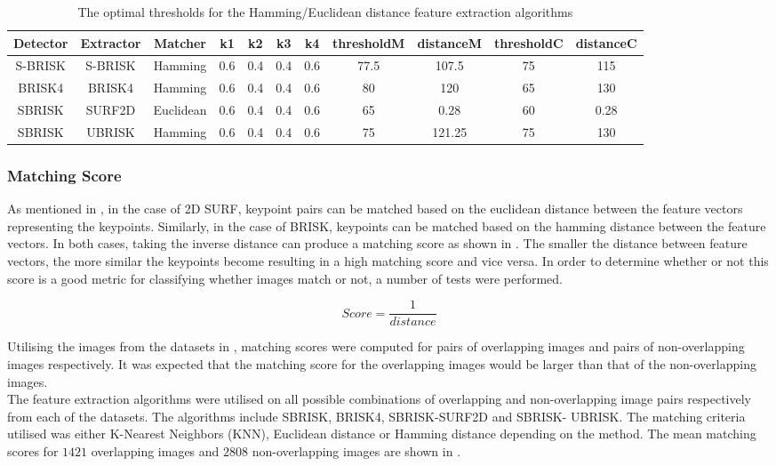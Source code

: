 \documentclass{article}
\begin{document}
\begin{table}
\caption{The optimal thresholds for the Hamming/Euclidean distance feature extraction algorithms}
\begin{tabular}{|c|c|c|c|c|c|c|c|c|c|c|}
\hline 
Detector & Extractor & Matcher & k1 & k2 & k3 & k4 & thresholdM & distanceM & thresholdC & distanceC\tabularnewline
\hline 
\hline 
S-BRISK & S-BRISK & Hamming & 0.6 & 0.4 & 0.4 & 0.6 & 77.5 & 107.5 & 75 & 115\tabularnewline
\hline 
BRISK4 & BRISK4 & Hamming & 0.6 & 0.4 & 0.4 & 0.6 & 80 & 120 & 65 & 130\tabularnewline
\hline 
SBRISK & SURF2D & Euclidean & 0.6 & 0.4 & 0.4 & 0.6 & 65 & 0.28 & 60 & 0.28\tabularnewline
\hline 
SBRISK & UBRISK & Hamming & 0.6 & 0.4 & 0.4 & 0.6 & 75 & 121.25 & 75 & 130\tabularnewline
\hline 
\end{tabular}
\label{tab:hammingStatistics}
\end{table}

\subsubsection{Matching Score}
\label{sec:matchingScore}
As mentioned in , in the case of 2D SURF, keypoint pairs can be matched based on the euclidean distance between the feature vectors representing the keypoints. Similarly, in the case of BRISK, keypoints can be matched based on the hamming distance between the feature vectors. In both cases, taking the inverse distance can produce a matching score as shown in . The smaller the distance between feature vectors, the more similar the keypoints become resulting in a high matching score and vice versa. In order to determine whether or not this score is a good metric for classifying whether images match or not, a number of tests were performed.

\begin{equation}
Score = \frac{1}{distance}
\label{eqn:inverseDistance}
\end{equation}

Utilising the images from the datasets in , matching scores were computed for pairs of overlapping images and pairs of non-overlapping images respectively. It was expected that the matching score for the overlapping images would be larger than that of the non-overlapping images. \\

The feature extraction algorithms were utilised on all possible combinations of overlapping and non-overlapping image pairs respectively from each of the datasets. The algorithms include SBRISK, BRISK4, SBRISK-SURF2D and SBRISK- UBRISK. The matching criteria utilised was either K-Nearest Neighbors (KNN), Euclidean distance or Hamming distance depending on the method. The mean matching scores for $1421$ overlapping images and $2808$ non-overlapping images are shown in . \\
\end{document}
